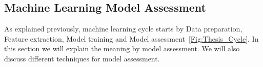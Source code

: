 \begin{figure}[!t]
 \centering
\end{figure}%


\subsection{Machine Learning Model Assessment}

As explained previously, machine learning cycle starts by Data preparation, Feature extraction, Model training and Model assessment~\ref{Fig:Thesis_Cycle}. In this section we will explain the meaning by model assessment. We will also discuss different techniques for model assessment.


